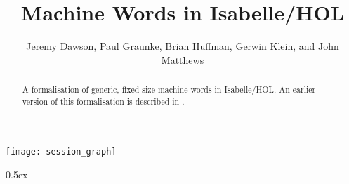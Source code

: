 \documentclass[11pt,a4paper]{article}
\begin{document}
\title{Machine Words in Isabelle/HOL}

\author{Jeremy Dawson, Paul Graunke, Brian Huffman, Gerwin Klein, and John Matthews}

\maketitle

\begin{abstract}
A formalisation of generic, fixed size machine words in Isabelle/HOL. An earlier version of this 
formalisation is described in \cite{dawson-avocs07}.  
\end{abstract}

\tableofcontents

\begin{center}
  \texttt{[image: session\_graph]}
\end{center}

\newpage

\renewcommand{\setisabellecontext}[1]{\markright{THEORY~``#1''}}

\parindent 0pt\parskip 0.5ex




\end{document}
